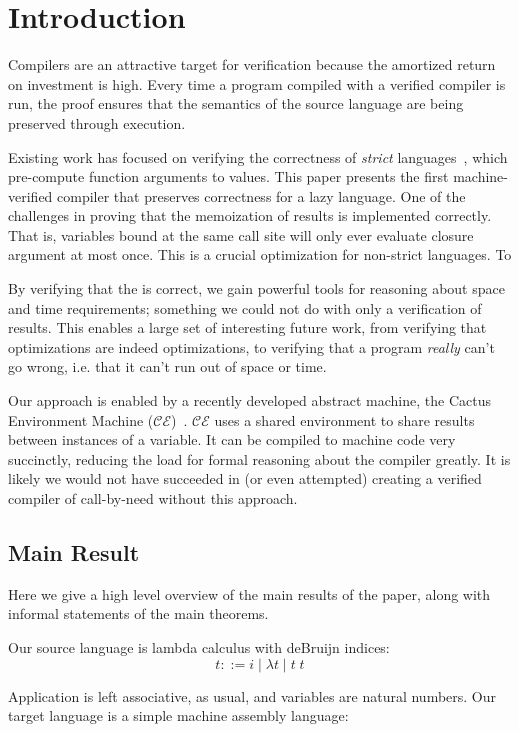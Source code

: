 \section{Introduction} \label{sec:intro}

Compilers are an attractive target for verification because the amortized return
on investment is high. Every time a program compiled with a verified compiler is
run, the proof ensures that the semantics of the source language are being
preserved through execution. 

Existing work has focused on verifying the correctness of \emph{strict}
languages~\cite{chlipala2007certified, leroy2012compcert}, which pre-compute
function arguments to values. This paper presents the first machine-verified
compiler that preserves correctness for a lazy language. One of the challenges
in proving that the memoization of results is implemented correctly. That is, 
variables bound at the same call site will only ever evaluate closure argument
at most once. This is a crucial optimization for non-strict languages. To  

By verifying that the is correct, we gain powerful tools for reasoning
about space and time requirements; something we could not do with only a
verification of results. This enables a large set of interesting future work,
from verifying that optimizations are indeed optimizations, to verifying that a
program \emph{really} can't go wrong, i.e. that it can't run out of space or
time. 

Our approach is enabled by a recently developed abstract machine, the Cactus
Environment Machine ($\mathcal{CE}$)~\cite{?}. $\mathcal{CE}$ uses a shared
environment to share results between instances of a variable. It can be compiled
to machine code very succinctly, reducing the load for formal reasoning about
the compiler greatly. It is likely we would not have succeeded in (or even
attempted) creating a verified compiler of call-by-need without this approach.

\subsection{Main Result}
Here we give a high level overview of the main results of the paper, along with
informal statements of the main theorems.

Our source language is lambda calculus with deBruijn indices: 
$$ t ::= i \; | \; \lambda t \; | \; t \; t $$

Application is left associative, as usual, and variables are natural numbers.
Our target language is a simple machine assembly language:

